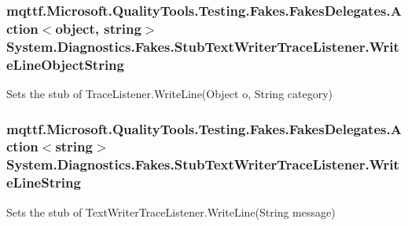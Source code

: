 \hypertarget{class_system_1_1_diagnostics_1_1_fakes_1_1_stub_text_writer_trace_listener_a25cfe61324fd43ea4f07858c0a40eb01}{
\subsubsection[{Write\-Line\-Object\-String}]{\setlength{\rightskip}{0pt plus 5cm}mqttf.\-Microsoft.\-Quality\-Tools.\-Testing.\-Fakes.\-Fakes\-Delegates.\-Action$<$object, string$>$ System.\-Diagnostics.\-Fakes.\-Stub\-Text\-Writer\-Trace\-Listener.\-Write\-Line\-Object\-String}}\label{class_system_1_1_diagnostics_1_1_fakes_1_1_stub_text_writer_trace_listener_a25cfe61324fd43ea4f07858c0a40eb01}


Sets the stub of Trace\-Listener.\-Write\-Line(\-Object o, String category)

\hypertarget{class_system_1_1_diagnostics_1_1_fakes_1_1_stub_text_writer_trace_listener_a21138fd21d0ba203bd84b6be033c8b00}{
\subsubsection[{Write\-Line\-String}]{\setlength{\rightskip}{0pt plus 5cm}mqttf.\-Microsoft.\-Quality\-Tools.\-Testing.\-Fakes.\-Fakes\-Delegates.\-Action$<$string$>$ System.\-Diagnostics.\-Fakes.\-Stub\-Text\-Writer\-Trace\-Listener.\-Write\-Line\-String}}\label{class_system_1_1_diagnostics_1_1_fakes_1_1_stub_text_writer_trace_listener_a21138fd21d0ba203bd84b6be033c8b00}


Sets the stub of Text\-Writer\-Trace\-Listener.\-Write\-Line(\-String message)

